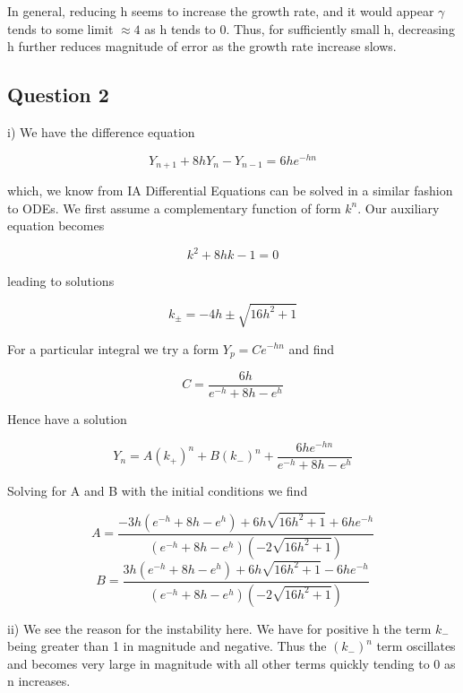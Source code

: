 \documentclass[10pt,a4paper]{report}
\begin{document}
In general, reducing h seems to increase the growth rate, and it would appear $\gamma$ tends to some limit $\approx 4$ as h tends to 0. Thus, for sufficiently small h, decreasing h further reduces magnitude of error as the growth rate increase slows.	



\subsection*{Question 2}

i) We have the difference equation

\begin{equation*}
Y_{n+1}+8hY_n-Y_{n-1}=6he^{-hn}
\end{equation*}

which, we know from IA Differential Equations can be solved in a similar fashion to ODEs. We first assume a complementary function of form $k^n$. Our auxiliary equation becomes

\begin{equation*}
k^2+8hk-1=0
\end{equation*}

leading to solutions 

\begin{equation*}
k_\pm=-4h\pm\sqrt{16h^2+1}
\end{equation*}

For a particular integral we try a form $Y_p=Ce^{-hn}$ and find

\begin{equation*}
C=\frac{6h}{e^{-h}+8h-e^h}
\end{equation*}

Hence have a solution

\begin{equation*}
Y_n=A(k_+)^n + B(k_-)^n +\frac{6he^{-hn}}{e^{-h}+8h-e^h}
\end{equation*}

Solving for A and B with the initial conditions we find

\begin{equation*}
A=\frac{-3h(e^{-h} + 8h - e^h)+6h\sqrt{16h^2+1}+6he^{-h}}{(e^{-h} + 8h - e^h)(-2\sqrt{16h^2+1})}
\end{equation*}
\begin{equation*}
B=\frac{3h(e^{-h} + 8h - e^h)+6h\sqrt{16h^2+1}-6he^{-h}}{(e^{-h} + 8h - e^h)(-2\sqrt{16h^2+1})}
\end{equation*}

ii) We see the reason for the instability here. We have for positive h the term $k_-$ being greater than 1 in magnitude and negative. Thus the $(k_-)^n$ term oscillates and becomes very large in magnitude with all other terms quickly tending to 0 as n increases.\\
\end{document}
